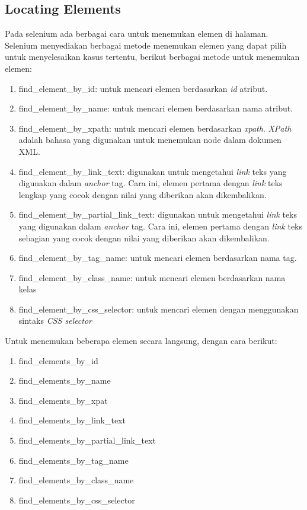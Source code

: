 \subsection{Locating Elements}
Pada selenium ada berbagai cara untuk menemukan elemen di halaman. Selenium menyediakan berbagai metode menemukan elemen yang dapat pilih untuk menyelesaikan kasus tertentu, berikut berbagai metode untuk menemukan elemen:
\begin{enumerate}
	\item find\_element\_by\_id: untuk mencari elemen berdasarkan \textit{id} atribut.
	\item find\_element\_by\_name: untuk mencari elemen berdasarkan nama atribut.
	\item find\_element\_by\_xpath: untuk mencari elemen berdasarkan \textit{xpath}. \textit{XPath} adalah bahasa yang digunakan untuk menemukan node dalam dokumen XML.
	\item find\_element\_by\_link\_text: digunakan untuk mengetahui \textit{link} teks yang digunakan dalam \textit{anchor} tag. Cara ini, elemen pertama dengan \textit{link} teks lengkap yang cocok dengan nilai yang diberikan akan dikembalikan. 
	\item find\_element\_by\_partial\_link\_text: digunakan untuk mengetahui \textit{link} teks yang digunakan dalam \textit{anchor} tag. Cara ini, elemen pertama dengan \textit{link} teks sebagian yang cocok dengan nilai yang diberikan akan dikembalikan. 
	\item find\_element\_by\_tag\_name: untuk mencari elemen berdasarkan nama tag.
	\item find\_element\_by\_class\_name: untuk mencari elemen berdasarkan nama kelas
	\item find\_element\_by\_css\_selector: untuk mencari elemen dengan menggunakan sintaks \textit{CSS selector}
\end{enumerate}
Untuk menemukan beberapa elemen secara langsung, dengan cara berikut:
\begin{enumerate}
	\item find\_elements\_by\_id
	\item find\_elements\_by\_name
	\item find\_elements\_by\_xpat
	\item find\_elements\_by\_link\_text
	\item find\_elements\_by\_partial\_link\_text
	\item find\_elements\_by\_tag\_name
	\item find\_elements\_by\_class\_name
	\item find\_elements\_by\_css\_selector
\end{enumerate}

